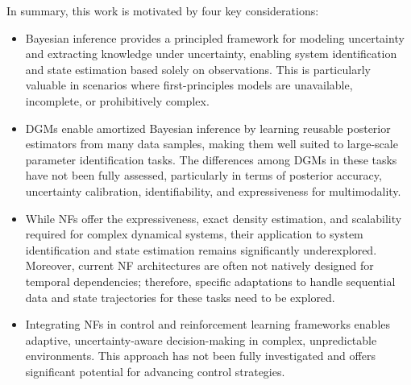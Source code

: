 In summary, this work is motivated by four key considerations:
\begin{itemize}
    \item Bayesian inference provides a principled framework for modeling uncertainty and extracting knowledge under uncertainty, enabling system identification and state estimation based solely on observations. This is particularly valuable in scenarios where first-principles models are unavailable, incomplete, or prohibitively complex.
    \item \acp{DGM} enable amortized Bayesian inference by learning reusable posterior estimators from many data samples, making them well suited to large-scale parameter identification tasks. The differences among \acp{DGM} in these tasks have not been fully assessed, particularly in terms of posterior accuracy, uncertainty calibration, identifiability, and expressiveness for multimodality.
    \item While \acfp{NF} offer the expressiveness, exact density estimation, and scalability required for complex dynamical systems, their application to system identification and state estimation remains significantly underexplored. Moreover, current \ac{NF} architectures are often not natively designed for temporal dependencies; therefore, specific adaptations to handle sequential data and state trajectories for these tasks need to be explored.
    \item Integrating \acfp{NF} in control and reinforcement learning frameworks enables adaptive, uncertainty-aware decision-making in complex, unpredictable environments. This approach has not been fully investigated and offers significant potential for advancing control strategies. 
\end{itemize}